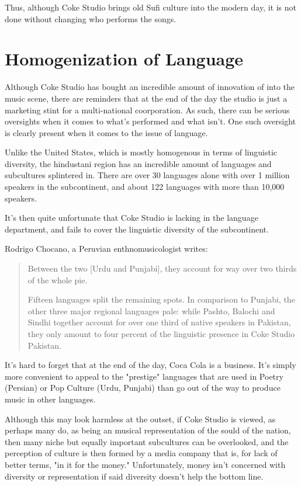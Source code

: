 \documentclass{article}
\begin{document}
Thus, although Coke Studio brings old Sufi culture into the modern day, it is not done
without changing who performs the songs. 

\section{Homogenization of Language}

Although Coke Studio has bought an incredible amount of innovation of into the
music scene, there are reminders that at the end of the day the studio is just a
marketing stint for a multi-national coorporation. As such, there can be serious
oversights when it comes to what's performed and what isn't. One such oversight is 
clearly present when it comes to the issue of language. 

Unlike the United States, which is mostly homogenous in terms of linguistic
diversity, the hindustani region has an incredible amount of languages and
subcultures splintered in.  There are over 30 languages alone with over 1
million speakers in the subcontinent, and about 122 languages with more than
10,000 speakers.

It's then quite unfortunate that Coke Studio is lacking in the language
department, and fails to cover the linguistic diversity of the subcontinent. 

Rodrigo Chocano, a Peruvian enthnomusicologist writes: 

\begin{quote}
  Between the two [Urdu and Punjabi], they account for way over two thirds of the whole pie.

  Fifteen languages split the remaining spots. In comparison to Punjabi, the other
  three major regional languages pale: while Pashto, Balochi and Sindhi together
  account for over one third of native speakers in Pakistan, they only amount to
  four percent of the linguistic presence in Coke Studio Pakistan.
\end{quote}

It's hard to forget that at the end of the day, Coca Cola is a business. It's
simply more convenient to appeal to the "prestige" languages that are used in
Poetry (Persian) or Pop Culture (Urdu, Punjabi) than go out of the way to produce 
music in other languages. 

Although this may look harmless at the outset, if Coke Studio is viewed, as
perhaps many do, as being an musical representation of the sould of the nation,
then many niche but equally important subcultures can be overlooked, and the
perception of culture is then formed by a media company that is, for lack of
better terms, "in it for the money." Unfortunately, money isn't concerned with
diversity or representation if said diversity doesn't help the bottom line.
\end{document}
